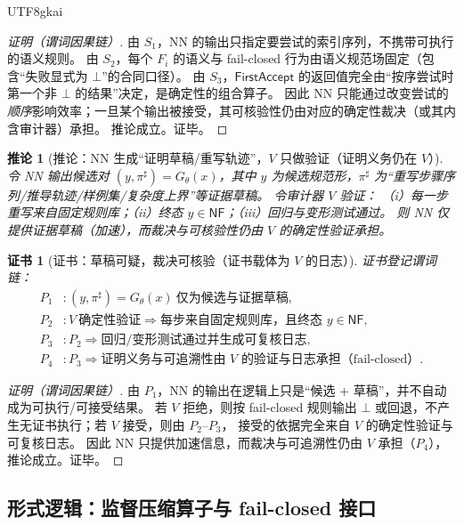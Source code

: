 \documentclass[12pt]{article}
\newtheorem{corollary}{推论}[section]
\newtheorem{Certificate}{证书}[section]
\begin{document}
\begin{CJK*}{UTF8}{gkai}
\begin{proof}[证明（谓词因果链）]
由 $S_1$，NN 的输出只指定要尝试的索引序列，不携带可执行的语义规则。
由 $S_2$，每个 $F_i$ 的语义与 fail-closed 行为由语义规范场固定（包含“失败显式为 $\bot$”的合同口径）。
由 $S_3$，$\mathsf{FirstAccept}$ 的返回值完全由“按序尝试时第一个非 $\bot$ 的结果”决定，是确定性的组合算子。
因此 NN 只能通过改变尝试的\emph{顺序}影响效率；一旦某个输出被接受，其可核验性仍由对应的确定性裁决（或其内含审计器）承担。
推论成立。证毕。
\end{proof}

\begin{corollary}[推论：NN 生成“证明草稿/重写轨迹”，$V$ 只做验证（证明义务仍在 $V$）]
\label{cor:audited-wrapper-nn-proof-sketch}
令 NN 输出候选对 $(y,\pi^\sharp)=G_\theta(x)$，其中 $y$ 为候选规范形，$\pi^\sharp$ 为“重写步骤序列/推导轨迹/样例集/复杂度上界”等证据草稿。
令审计器 $V$ 验证：
（i）每一步重写来自固定规则库；（ii）终态 $y\in\mathsf{NF}$；（iii）回归与变形测试通过。
则 NN 仅提供证据草稿（加速），而裁决与可核验性仍由 $V$ 的确定性验证承担。
\end{corollary}

\begin{Certificate}[证书：草稿可疑，裁决可核验（证书载体为 $V$ 的日志）]
\label{cert:audited-wrapper-nn-proof-sketch}
证书登记谓词链：
\[
\begin{aligned}
  P_1 &: (y,\pi^\sharp)=G_\theta(x)\ \text{仅为候选与证据草稿},\\
  P_2 &: V\ \text{确定性验证}\Rightarrow \text{每步来自固定规则库，且终态 }y\in\mathsf{NF},\\
  P_3 &: P_2\Rightarrow \text{回归/变形测试通过并生成可复核日志},\\
  P_4 &: P_3\Rightarrow \text{证明义务与可追溯性由 }V\text{ 的验证与日志承担（fail-closed）}.
\end{aligned}
\]
\end{Certificate}

\begin{proof}[证明（谓词因果链）]
由 $P_1$，NN 的输出在逻辑上只是“候选 + 草稿”，并不自动成为可执行/可接受结果。
若 $V$ 拒绝，则按 fail-closed 规则输出 $\bot$ 或回退，不产生无证书执行；若 $V$ 接受，则由 $P_2$--$P_3$，
接受的依据完全来自 $V$ 的确定性验证与可复核日志。
因此 NN 只提供加速信息，而裁决与可追溯性仍由 $V$ 承担（$P_4$），推论成立。证毕。
\end{proof}

\subsection{形式逻辑：监督压缩算子与 fail-closed 接口}
\label{sec:audited-wrapper-compression}


\end{CJK*}
\end{document}
